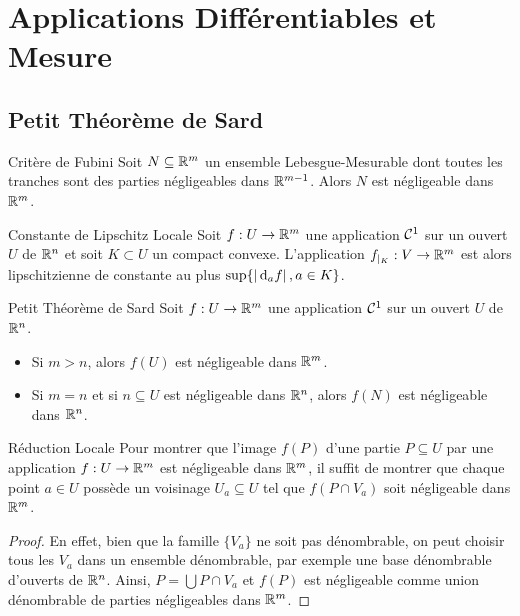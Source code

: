 \documentclass{cours}
\begin{document}
\section{Applications Différentiables et Mesure}
\subsection{Petit Théorème de Sard}
\begin{lemme}{Critère de Fubini}{}
    Soit $N \subseteq \mathbb{R}^{m}$ un ensemble Lebesgue-Mesurable dont toutes les tranches sont des parties négligeables dans $\mathbb{R}^{m - 1}$. Alors $N$ est négligeable dans $\mathbb{R}^{m}$.
\end{lemme}

\begin{lemme}{Constante de Lipschitz Locale}{}
    Soit $f : U \to \mathbb{R}^{m}$ une application $\mathcal{C}^{1}$ sur un ouvert $U$ de $\mathbb{R}^{n}$ et soit $K \subset U$ un compact convexe. L'application $f_{\mid_{K}} : V \to \mathbb{R}^{m}$ est alors lipschitzienne de constante au plus $\sup \{\left|{\rm \, d}_{a}f\right|, a \in K\}$.
\end{lemme}

\begin{propositionfr}{Petit Théorème de Sard}{}
    Soit $f : U \to \mathbb{R}^{m}$ une application $\mathcal{C}^{1}$ sur un ouvert $U$ de $\mathbb{R}^{n}$.
    \begin{itemize}
        \item Si $m > n$, alors $f(U)$ est négligeable dans $\mathbb{R}^{m}$.
        \item Si $m = n$ et si $n \subseteq U$ est négligeable dans $\mathbb{R}^{n}$, alors $f(N)$ est négligeable dans $\mathbb{R}^{n}$.
    \end{itemize}
\end{propositionfr}

\begin{lemme}{Réduction Locale}{}
    Pour montrer que l'image $f(P)$ d'une partie $P \subseteq U$ par une application $f : U \to \mathbb{R}^{m}$ est négligeable dans $\mathbb{R}^{m}$, il suffit de montrer que chaque point $a \in U$ possède un voisinage $U_{a} \subseteq U$ tel que $f(P\cap V_{a})$ soit négligeable dans $\mathbb{R}^{m}$.
\end{lemme}
\begin{proof}
    En effet, bien que la famille $\{V_{a}\}$ ne soit pas dénombrable, on peut choisir tous les $V_{a}$ dans un ensemble dénombrable, par exemple une base dénombrable d'ouverts de $\mathbb{R}^{n}$. Ainsi, $P = \bigcup P\cap V_{a}$ et $f(P)$ est négligeable comme union dénombrable de parties négligeables dans $\mathbb{R}^{m}$.
\end{proof}
\end{document}
